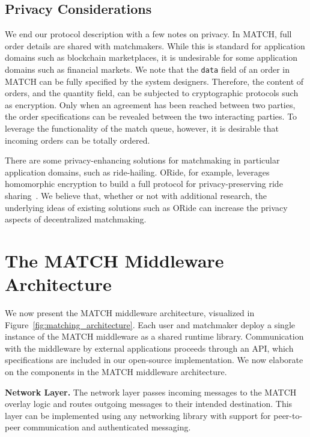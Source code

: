 \subsection{Privacy Considerations}
We end our protocol description with a few notes on privacy.
In MATCH, full order details are shared with matchmakers.
While this is standard for application domains such as blockchain marketplaces, it is undesirable for some application domains such as financial markets.
We note that the \texttt{data} field of an order in MATCH can be fully specified by the system designers.
Therefore, the content of orders, and the quantity field, can be subjected to cryptographic protocols such as encryption.
Only when an agreement has been reached between two parties, the order specifications can be revealed between the two interacting parties.
To leverage the functionality of the match queue, however, it is desirable that incoming orders can be totally ordered.

There are some privacy-enhancing solutions for matchmaking in particular application domains, such as ride-hailing.
ORide, for example, leverages homomorphic encryption to build a full protocol for privacy-preserving ride sharing~\cite{pham2017oride}.
We believe that, whether or not with additional research, the underlying ideas of existing solutions such as ORide can increase the privacy aspects of decentralized matchmaking.

\section{The MATCH Middleware Architecture}
\label{sec:architecture}
We now present the MATCH middleware architecture, visualized in Figure~\ref{fig:matching_architecture}.
Each user and matchmaker deploy a single instance of the MATCH middleware as a shared runtime library.
Communication with the middleware by external applications proceeds through an API, which specifications are included in our open-source implementation.
We now elaborate on the components in the MATCH middleware architecture.

\textbf{Network Layer.}
The network layer passes incoming messages to the MATCH overlay logic and routes outgoing messages to their intended destination.
This layer can be implemented using any networking library with support for peer-to-peer communication and authenticated messaging.

